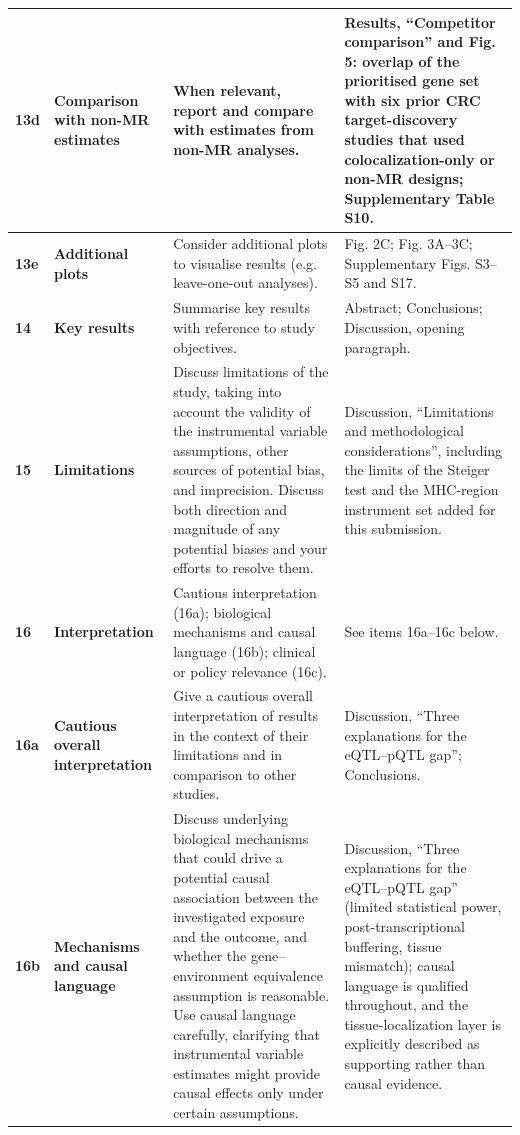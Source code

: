 \documentclass[10pt,a4paper]{article}
\begin{document}
\begin{longtable}{@{}p{7mm}p{32mm}p{52mm}p{68mm}@{}}
\midrule
\textbf{13d} & \textbf{Comparison with non-MR estimates} & When relevant, report and compare with estimates from non-MR analyses. & Results, ``Competitor comparison'' and Fig. 5: overlap of the prioritised gene set with six prior CRC target-discovery studies that used colocalization-only or non-MR designs; Supplementary Table S10. \\
\midrule
\textbf{13e} & \textbf{Additional plots} & Consider additional plots to visualise results (e.g. leave-one-out analyses). & Fig. 2C; Fig. 3A--3C; Supplementary Figs. S3--S5 and S17. \\
\midrule
\textbf{14} & \textbf{Key results} & Summarise key results with reference to study objectives. & Abstract; Conclusions; Discussion, opening paragraph. \\
\midrule
\textbf{15} & \textbf{Limitations} & Discuss limitations of the study, taking into account the validity of the instrumental variable assumptions, other sources of potential bias, and imprecision. Discuss both direction and magnitude of any potential biases and your efforts to resolve them. & Discussion, ``Limitations and methodological considerations'', including the limits of the Steiger test and the MHC-region instrument set added for this submission. \\
\midrule
\textbf{16} & \textbf{Interpretation} & Cautious interpretation (16a); biological mechanisms and causal language (16b); clinical or policy relevance (16c). & See items 16a--16c below. \\
\midrule
\textbf{16a} & \textbf{Cautious overall interpretation} & Give a cautious overall interpretation of results in the context of their limitations and in comparison to other studies. & Discussion, ``Three explanations for the eQTL--pQTL gap''; Conclusions. \\
\midrule
\textbf{16b} & \textbf{Mechanisms and causal language} & Discuss underlying biological mechanisms that could drive a potential causal association between the investigated exposure and the outcome, and whether the gene--environment equivalence assumption is reasonable. Use causal language carefully, clarifying that instrumental variable estimates might provide causal effects only under certain assumptions. & Discussion, ``Three explanations for the eQTL--pQTL gap'' (limited statistical power, post-transcriptional buffering, tissue mismatch); causal language is qualified throughout, and the tissue-localization layer is explicitly described as supporting rather than causal evidence. \\

\end{longtable}
\end{document}
